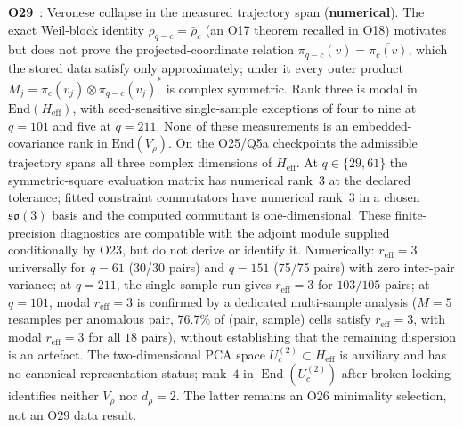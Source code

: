 \documentclass[11pt,a4paper]{article}
\newcommand{\snum}{\textcolor{cnum}{\textbf{numerical}}}
\begin{document}
    \textbf{O29}~\cite{Beau2026a33}: Veronese collapse in the measured trajectory span
    (\snum).
    The exact Weil-block identity $\rho_{q-c} = \bar\rho_c$ (an O17 theorem recalled in O18) motivates
    but does not prove the projected-coordinate relation $\pi_{q-c}(v) = \overline{\pi_c(v)}$, which the
    stored data satisfy only approximately; under it every outer
    product $M_j = \pi_c(v_j) \otimes \pi_{q-c}(v_j)^*$ is complex symmetric.
    Rank three is modal in $\mathrm{End}(H_{\mathrm{eff}})$, with seed-sensitive single-sample
    exceptions of four to nine at $q=101$ and five at $q=211$.
    None of these measurements is an embedded-covariance rank in $\mathrm{End}(V_\rho)$.
    On the O25/Q5a checkpoints the admissible trajectory spans all three complex dimensions of
    $H_{\mathrm{eff}}$. At $q\in\{29,61\}$ the symmetric-square evaluation matrix has numerical
    rank~$3$ at the declared tolerance; fitted constraint commutators have numerical rank~$3$ in a
    chosen $\mathfrak{so}(3)$ basis and the computed commutant is one-dimensional. These
    finite-precision diagnostics are compatible with the adjoint module supplied conditionally by
    O23, but do not derive or identify it.
    Numerically: $r_{\mathrm{eff}} = 3$ universally for $q = 61$ (30/30 pairs) and
    $q = 151$ (75/75 pairs) with zero inter-pair variance;
    at $q = 211$, the single-sample run gives $r_{\mathrm{eff}}=3$ for $103/105$ pairs;
    at $q = 101$, modal $r_{\mathrm{eff}} = 3$
    is confirmed by a dedicated multi-sample analysis ($M = 5$ resamples per anomalous pair,
    $76.7\%$ of (pair, sample) cells satisfy $r_{\mathrm{eff}} = 3$, with modal $r_{\mathrm{eff}}=3$
    for all $18$ pairs), without establishing that the remaining dispersion is an artefact.
    The two-dimensional PCA space $U_c^{(2)}\subset H_{\mathrm{eff}}$ is auxiliary and has no
    canonical representation status; rank~$4$ in $\operatorname{End}(U_c^{(2)})$ after broken
    locking identifies neither $V_\rho$ nor $d_\rho=2$. The latter remains an O26 minimality
    selection, not an O29 data result.
\end{document}
